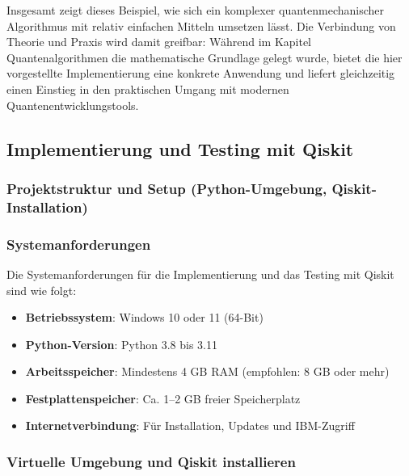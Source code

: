 Insgesamt zeigt dieses Beispiel, wie sich ein komplexer quantenmechanischer Algorithmus mit relativ einfachen Mitteln umsetzen lässt. Die Verbindung von Theorie und Praxis wird damit greifbar: Während im Kapitel Quantenalgorithmen die mathematische Grundlage gelegt wurde, bietet die hier vorgestellte Implementierung eine konkrete Anwendung und liefert gleichzeitig einen Einstieg in den praktischen Umgang mit modernen Quantenentwicklungstools.

\subsection{Implementierung und Testing mit Qiskit}
\subsubsection{Projektstruktur und Setup (Python-Umgebung, Qiskit-Installation)}

\setlength{\parindent}{0pt} %
\setlength{\parskip}{1em}   %

\subsubsection*{Systemanforderungen}
Die Systemanforderungen für die Implementierung und das Testing mit Qiskit sind wie folgt:
\begin{itemize}
    \item \textbf{Betriebssystem}: Windows 10 oder 11 (64-Bit)
    \item \textbf{Python-Version}: Python 3.8 bis 3.11
    \item \textbf{Arbeitsspeicher}: Mindestens 4 GB RAM (empfohlen: 8 GB oder mehr)
    \item \textbf{Festplattenspeicher}: Ca. 1--2 GB freier Speicherplatz
    \item \textbf{Internetverbindung}: Für Installation, Updates und IBM-Zugriff
\end{itemize}

\subsubsection*{Virtuelle Umgebung und Qiskit installieren}

